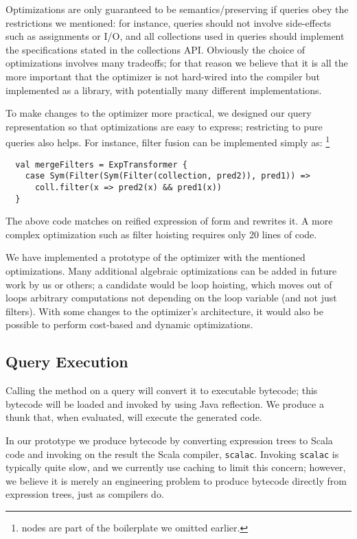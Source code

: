 Optimizations are only guaranteed to be semantics\-/preserving if queries obey the
restrictions we mentioned: for instance, queries should not involve
side-effects such as assignments or I/O, and all collections used in queries
should implement the specifications stated in the collections API\@. Obviously the choice of optimizations involves many tradeoffs; for that reason
we believe that it is all the more important that the optimizer is not
hard-wired into the compiler but implemented as a library, with potentially
many different implementations.

To make changes to the optimizer more practical, we designed our query
representation so that optimizations are easy to express; restricting to pure
queries also helps. For instance, filter fusion can be implemented simply as:%
\footnote{ nodes are part of the boilerplate we omitted earlier.}
\begin{lstlisting}
  val mergeFilters = ExpTransformer {
    case Sym(Filter(Sym(Filter(collection, pred2)), pred1)) =>
      coll.filter(x => pred2(x) && pred1(x))
  }
\end{lstlisting}
The above code matches on reified expression of form
  and rewrites it. A more complex
optimization such as filter hoisting requires only 20 lines of code.

We have implemented a prototype of the optimizer with the mentioned
optimizations. Many additional algebraic optimizations can be added in future
work by us or others; a candidate would be loop hoisting, which moves out of
loops arbitrary computations not depending on the loop variable (and not just filters).
With some changes to the optimizer's architecture, it would also be possible to perform cost-based and dynamic optimizations.

\subsection{Query Execution}
\label{sec:execution}
Calling the  method on a query will convert it to executable
bytecode; this bytecode will be loaded and invoked by using Java reflection.
We produce a thunk that, when evaluated, will execute the
generated code.

In our prototype we produce bytecode by converting expression trees to
Scala code and invoking on the result the Scala compiler, \texttt{scalac}. Invoking
\texttt{scalac} is typically quite slow, and we currently use caching to limit
this concern; however, we believe it is merely an engineering problem to
produce bytecode directly from expression trees, just as compilers do.

